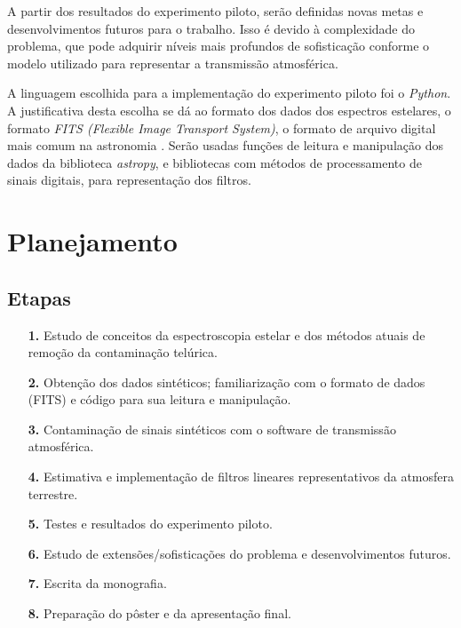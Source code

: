 \documentclass[11pt,twoside,a4paper]{article}
\begin{document}
A partir dos resultados do experimento piloto, serão definidas novas metas e desenvolvimentos futuros para o trabalho. Isso é devido à complexidade do problema, que pode adquirir níveis mais profundos de sofisticação conforme o modelo utilizado para representar a transmissão atmosférica.

A linguagem escolhida para a implementação do experimento piloto foi o \textit{Python}. A justificativa desta escolha se dá ao formato dos dados dos espectros estelares, o formato \textit{FITS (Flexible Image Transport System)}, o formato de arquivo digital mais comum na astronomia \cite{2010A&A...524A..42P}. Serão usadas funções de leitura e manipulação dos dados da biblioteca \textit{astropy}, e bibliotecas com métodos de processamento de sinais digitais, para representação dos filtros.



\newpage
\section{Planejamento}\label{sec:planejamento}
\doublespacing
\subsection{Etapas}
\begin{itemize}
    \item [\textbf{1.}] Estudo de conceitos da espectroscopia estelar e dos métodos atuais de remoção da contaminação telúrica.
    \item [\textbf{2.}] Obtenção dos dados sintéticos; familiarização com o formato de dados (FITS) e código para sua leitura e manipulação.
    \item [\textbf{3.}] Contaminação de sinais sintéticos com o software de transmissão atmosférica.
    \item [\textbf{4.}] Estimativa e implementação de filtros lineares representativos da atmosfera terrestre.
    \item [\textbf{5.}] Testes e resultados do experimento piloto.
    \item [\textbf{6.}] Estudo de extensões/sofisticações do problema e desenvolvimentos futuros.
    \item [\textbf{7.}] Escrita da monografia.
    \item [\textbf{8.}] Preparação do pôster e da apresentação final.
\end{itemize}
\end{document}
